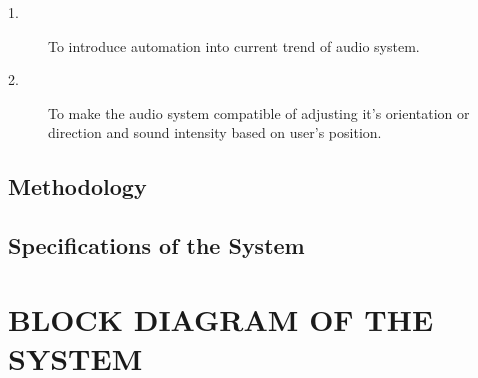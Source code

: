 \documentclass[twocolumn]{report}
\begin{document}
\begin{description}
    \item[1.]To introduce automation into current trend of audio system.
    \item[2.]To make the audio system compatible of adjusting it’s 
                orientation or direction and sound intensity based on user's 
                position.
\end{description}

\section{Methodology}



\section{Specifications of the System}



\chapter{BLOCK DIAGRAM OF THE SYSTEM}


\end{document}
